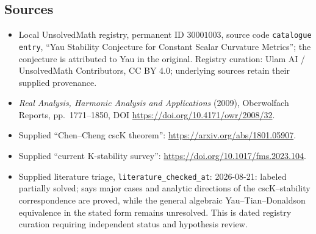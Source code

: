 \documentclass[11pt]{article}
\begin{document}
\subsection{Sources}
\begin{itemize}
\item Local UnsolvedMath registry, permanent ID \(30001003\), source code \texttt{catalogue entry}, ``Yau Stability Conjecture for Constant Scalar Curvature Metrics''; the conjecture is attributed to Yau in the original. Registry curation: Ulam AI / UnsolvedMath Contributors, CC BY 4.0; underlying sources retain their supplied provenance.
\item \emph{Real Analysis, Harmonic Analysis and Applications} (2009), Oberwolfach Reports, pp.\ 1771--1850, DOI \url{https://doi.org/10.4171/owr/2008/32}.
\item Supplied ``Chen--Cheng cscK theorem'': \url{https://arxiv.org/abs/1801.05907}.
\item Supplied ``current K-stability survey'': \url{https://doi.org/10.1017/fms.2023.104}.
\item Supplied literature triage, \texttt{literature\_checked\_at}: 2026-08-21: labeled partially solved; says major cases and analytic directions of the cscK--stability correspondence are proved, while the general algebraic Yau--Tian--Donaldson equivalence in the stated form remains unresolved. This is dated registry curation requiring independent status and hypothesis review.
\end{itemize}
\end{document}
